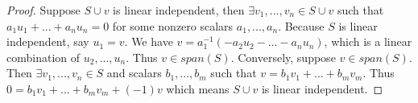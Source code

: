 \begin{proof}
	Suppose $S \cup {v}$ is linear independent, then $\exists v_1, ... , v_n \in S \cup {v}$ such that $a_1u_1+...+a_nu_n = 0$ for some nonzero scalars $a_1, ... ,a_n$. Because $S$ is linear independent, say $u_1 = v$. We have $v = a_1^{-1}(-a_2u_2-...-a_nu_n)$, which is a linear combination of ${u_2,...,u_n}$. Thus $v \in span(S)$. Conversely, suppose $v \in span(S)$. Then $\exists v_1,...,v_n \in S$ and scalars $b_1,...,b_m$ such that $v=b_1v_1+...+b_mv_m$. Thus $0=b_1v_1+...+b_mv_m+(-1)v$ which means $S \cup {v}$ is linear independent.
\end{proof}